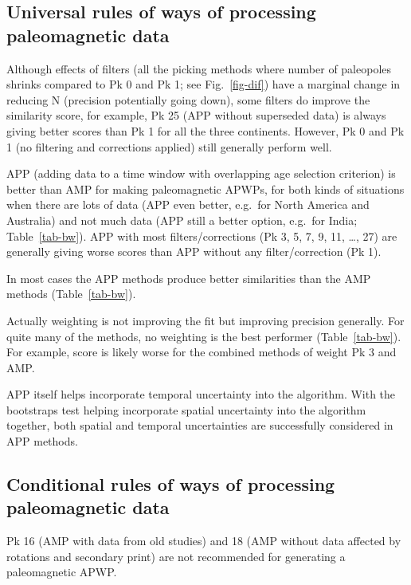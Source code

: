 \subsection{Universal rules of ways of processing paleomagnetic data}
%
\begin{description}
  \item Although effects of filters (all the picking methods where number of
	paleopoles shrinks compared to Pk 0 and Pk 1; see Fig.~\ref{fig-dif}) have a
	marginal change in reducing N (precision potentially going down), some
	filters do improve the similarity score, for example, Pk 25 (APP without
	superseded data) is always giving better scores than Pk 1 for all the
	three continents. However, Pk 0 and Pk 1 (no filtering and corrections
	applied) still generally perform well.
  \item APP (adding data to a time window with overlapping age selection
	criterion) is better than AMP for making paleomagnetic APWPs, for both kinds
	of situations when there are lots of data (APP even better, e.g.\ for North
	America and Australia) and not much data (APP still a better option, e.g.\
	for India; Table~\ref{tab-bw}). APP with most filters/corrections (Pk 3, 5,
	7, 9, 11, \ldots, 27) are generally giving worse scores than APP without any
	filter/correction (Pk 1).
  \item In most cases the APP methods produce better similarities than the AMP
	methods (Table~\ref{tab-bw}).
  \item Actually weighting is not improving the fit but improving precision
	generally. For quite many of the methods, no weighting is the best performer
	(Table~\ref{tab-bw}). For example, score is likely worse for the combined
	methods of weight Pk 3 and AMP\@.
  \item APP itself helps incorporate temporal uncertainty into the algorithm.
	With the bootstraps test helping incorporate spatial uncertainty into the
	algorithm together, both spatial and temporal uncertainties are successfully
	considered in APP methods.
\end{description}

\subsection{Conditional rules of ways of processing paleomagnetic data}
%
\begin{description}
  \item Pk 16 (AMP with data from old studies) and 18 (AMP
	without data affected by rotations and secondary print) are not recommended
	for generating a paleomagnetic APWP\@.
\end{description}

